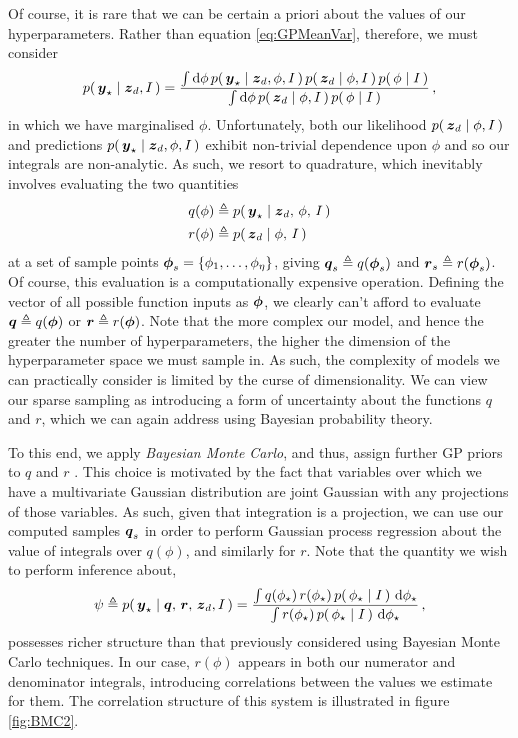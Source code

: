 \documentclass{acmtrans2m}
\begin{document}
\noindent Of course, it is rare that we can be certain a priori about the values of our hyperparameters. Rather than equation \eqref{eq:GPMeanVar}, therefore, we must consider
\begin{equation} \label{eq:Marginalising}
 p\!\left(\,\boldsymbol{y}_\star\mid\boldsymbol{z}_d,I\,\right)=\frac{\int\mathrm{d}\phi\, p\!\left(\,\boldsymbol{y}_\star\mid\boldsymbol{z}_d,\phi,I\,\right)p\!\left(\,\boldsymbol{z}_d\mid\phi,I\,\right)p\!\left(\,\phi\mid I\,\right)}
{\int\mathrm{d}\phi\, p\!\left(\,\boldsymbol{z}_d\mid\phi,I\,\right)p\!\left(\,\phi\mid I\,\right)}\,,
\end{equation}
in which we have marginalised $\phi$. Unfortunately, both our likelihood $p\!\left(\,\boldsymbol{z}_d\mid\phi,I\,\right)$ and predictions $p\!\left(\,\boldsymbol{y}_\star\mid\boldsymbol{z}_d,\phi,I\,\right)$ exhibit non-trivial dependence upon $\phi$ and so our integrals are non-analytic. As such, we resort to quadrature, which inevitably involves evaluating the two quantities
\begin{equation}
\begin{split}
q(\phi)& \triangleq p\!\left(\,\boldsymbol{y}_\star\mid\boldsymbol{z}_d,\,\phi,\,I\,\right) \\
r(\phi)& \triangleq p\!\left(\,\boldsymbol{z}_d\mid\phi,\,I\,\right)
\end{split}
\end{equation}
at a set of sample points $\boldsymbol{\phi}_s=\{\phi_1,\ldots,\phi_\eta\}$, giving $\boldsymbol{q}_s\triangleq q(\boldsymbol{\phi}_s)$ and $\boldsymbol{r}_s\triangleq r(\boldsymbol{\phi}_s)$. Of course, this evaluation is a computationally expensive operation. Defining the vector of all possible function inputs as $\boldsymbol{\phi}$, we clearly can't afford to evaluate $\boldsymbol{q}\triangleq q(\boldsymbol{\phi})$ or $\boldsymbol{r}\triangleq r(\boldsymbol{\phi})$. Note that the more complex our model, and hence the greater the number of hyperparameters, the higher the dimension of the hyperparameter space we must sample in. As such, the complexity of models we can practically consider is limited by the curse of dimensionality. We can view our sparse sampling as introducing a form of uncertainty about the functions $q$ and $r$, which we can again address using Bayesian probability theory. 

To this end, we apply \emph{Bayesian Monte Carlo}, and thus, assign further GP priors to $q$ and $r$ \cite{BZMonteCarlo}. This choice is motivated by the fact that variables over which we have a multivariate Gaussian distribution are joint Gaussian with any projections of those variables. As such, given that integration is a projection, we can use our computed samples $\boldsymbol{q}_s$ in order to perform Gaussian process regression about the value of integrals over $q(\phi)$, and similarly for $r$. Note that the quantity we wish to perform inference about, 
\begin{equation}
 \psi\triangleq p\!\left(\,\boldsymbol{y}_\star\mid\boldsymbol{q},\,\boldsymbol{r},\,\boldsymbol{z}_d,I\,\right)= \frac{\int q(\phi_\star)\,r(\phi_\star)\,p\!\left(\,\phi_\star\mid I\,\right)\,\mathrm{d}\phi_\star}
{\int r(\phi_\star)\,p\!\left(\,\phi_\star\mid I\,\right)\,\mathrm{d}\phi_\star}\,,
\end{equation} 
possesses richer structure than that previously considered using Bayesian Monte Carlo techniques. In our case, $r(\phi)$ appears in both our numerator and denominator integrals, introducing correlations between the values we estimate for them. The correlation structure of this system is illustrated in figure \ref{fig:BMC2}. 
\end{document}
